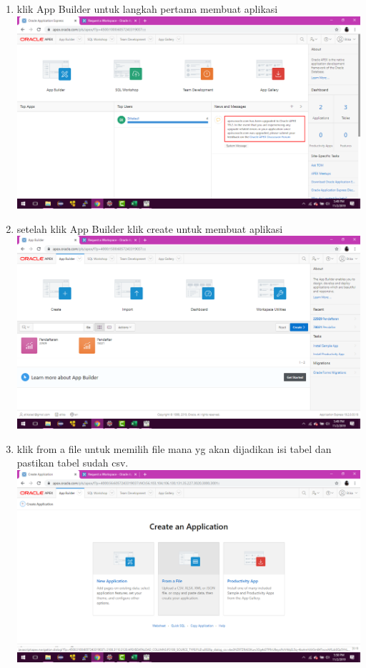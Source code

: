 \begin{enumerate}
\item klik App Builder untuk langkah pertama membuat aplikasi\\
\includegraphics[scale= 0.3]{gambar/4.png}\\
\item setelah klik App Builder klik create untuk membuat aplikasi\\
\includegraphics[scale= 0.3]{gambar/5.png}\\
\item klik from a file untuk memilih file mana yg akan dijadikan isi tabel dan pastikan tabel sudah csv.\\
\includegraphics[scale= 0.3]{gambar/6.png}\\

\end{enumerate}
